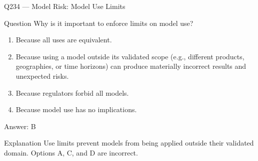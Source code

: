 \documentclass[aspectratio=169,8pt]{beamer}
\begin{document}
																																									\begin{frame}{Q234 --- Model Risk: Model Use Limits}
																																										\begin{block}{Question}
																																											Why is it important to enforce limits on model use?
																																											\begin{enumerate}
																																												\item Because all uses are equivalent.
																																												\item Because using a model outside its validated scope (e.g., different products, geographies, or time horizons) can produce materially incorrect results and unexpected risks.
																																												\item Because regulators forbid all models.
																																												\item Because model use has no implications.
																																											\end{enumerate}  \end{block}
																																											\begin{exampleblock}{Answer: B}\end{exampleblock}
																																											\begin{block}{Explanation}
																																												Use limits prevent models from being applied outside their validated domain. Options A, C, and D are incorrect.
																																											\end{block}
																																										\end{frame}
																																										
\end{document}
